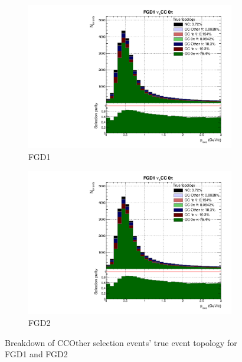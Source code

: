 \begin{figure}[h]
	\begin{subfigure}[t]{0.49\textwidth}
		\includegraphics[width=\textwidth,page=17, trim={0mm 0mm 0mm 9mm}, clip]{figures/mach3/2018/Selection/2018_FullNoRedNDmatrix_rebin_verbose_may_diagnostics}
		\caption{FGD1}
	\end{subfigure}
	\begin{subfigure}[t]{0.49\textwidth}
		\includegraphics[width=\textwidth,page=23, trim={0mm 0mm 0mm 9mm}, clip]{figures/mach3/2018/Selection/2018_FullNoRedNDmatrix_rebin_verbose_may_diagnostics}
		\caption{FGD2}
	\end{subfigure}
	\caption{Breakdown of \numubar CCOther selection events' true event topology for FGD1 and FGD2 }
	\label{fig:numubar_ccOth_topology}
\end{figure}

